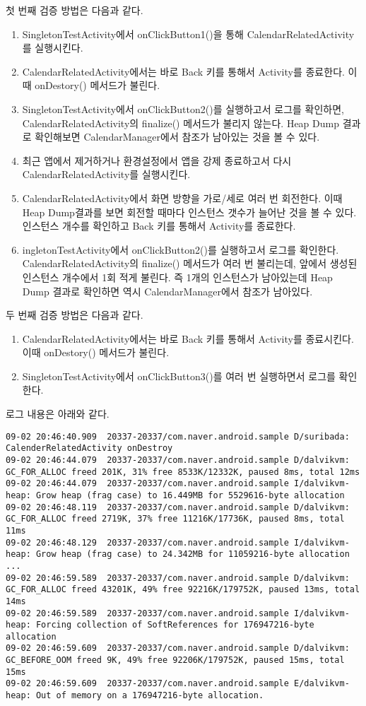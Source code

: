 첫 번째 검증 방법은 다음과 같다.
\begin{enumerate}
\item SingletonTestActivity에서 onClickButton1()을 통해 CalendarRelatedActivity를 실행시킨다.
\item CalendarRelatedActivity에서는 바로 Back 키를 통해서 Activity를 종료한다. 이때 onDestory() 메서드가 불린다.
\item SingletonTestActivity에서 onClickButton2()를 실행하고서 로그를 확인하면, CalendarRelatedActivity의 finalize() 메서드가 불리지 않는다. Heap Dump 결과로 확인해보면 CalendarManager에서 참조가 남아있는 것을 볼 수 있다. 
\item 최근 앱에서 제거하거나 환경설정에서 앱을 강제 종료하고서 다시 CalendarRelatedActivity를 실행시킨다.
\item CalendarRelatedActivity에서 화면 방향을 가로/세로 여러 번 회전한다. 이때 Heap Dump결과를 보면 회전할 때마다 인스턴스 갯수가 늘어난 것을 볼 수 있다. 인스턴스 개수를 확인하고 Back 키를 통해서 Activity를 종료한다.
\item ingletonTestActivity에서 onClickButton2()를 실행하고서 로그를 확인한다. CalendarRelatedActivity의 finalize() 메서드가 여러 번 불리는데, 앞에서 생성된 인스턴스 개수에서 1회 적게 불린다. 즉 1개의 인스턴스가 남아있는데 Heap Dump 결과로 확인하면 역시 CalendarManager에서 참조가 남아있다.
\end{enumerate}


두 번째 검증 방법은 다음과 같다.
\begin{enumerate}
\item CalendarRelatedActivity에서는 바로 Back 키를 통해서 Activity를 종료시킨다. 이때 onDestory() 메서드가 불린다.
\item SingletonTestActivity에서 onClickButton3()를 여러 번 실행하면서 로그를 확인한다.
\end{enumerate}

로그 내용은 아래와 같다.
\begin{lstlisting}[frame=single]
09-02 20:46:40.909  20337-20337/com.naver.android.sample D/suribada: CalenderRelatedActivity onDestroy
09-02 20:46:44.079  20337-20337/com.naver.android.sample D/dalvikvm: GC_FOR_ALLOC freed 201K, 31% free 8533K/12332K, paused 8ms, total 12ms
09-02 20:46:44.079  20337-20337/com.naver.android.sample I/dalvikvm-heap: Grow heap (frag case) to 16.449MB for 5529616-byte allocation
09-02 20:46:48.119  20337-20337/com.naver.android.sample D/dalvikvm: GC_FOR_ALLOC freed 2719K, 37% free 11216K/17736K, paused 8ms, total 11ms
09-02 20:46:48.129  20337-20337/com.naver.android.sample I/dalvikvm-heap: Grow heap (frag case) to 24.342MB for 11059216-byte allocation
...
09-02 20:46:59.589  20337-20337/com.naver.android.sample D/dalvikvm: GC_FOR_ALLOC freed 43201K, 49% free 92216K/179752K, paused 13ms, total 14ms
09-02 20:46:59.589  20337-20337/com.naver.android.sample I/dalvikvm-heap: Forcing collection of SoftReferences for 176947216-byte allocation
09-02 20:46:59.609  20337-20337/com.naver.android.sample D/dalvikvm: GC_BEFORE_OOM freed 9K, 49% free 92206K/179752K, paused 15ms, total 15ms
09-02 20:46:59.609  20337-20337/com.naver.android.sample E/dalvikvm-heap: Out of memory on a 176947216-byte allocation.
\end{lstlisting}

